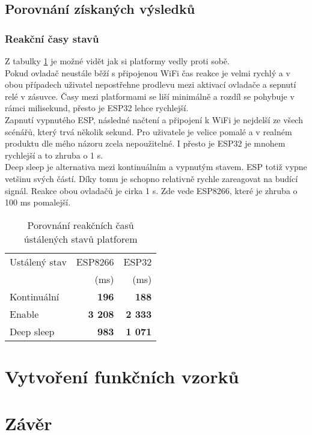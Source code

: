\documentclass[a4paper, 12pt]{report}
\begin{document}
		\section{Porovnání získaných výsledků}
			\subsection{Reakční časy stavů}
			Z tabulky \ref{Porovnání klidové režimy čas} je možné vidět jak si platformy vedly proti sobě. \\
			Pokud ovladač neustále běží s připojenou WiFi čas reakce je velmi rychlý a v obou případech uživatel nepostřehne prodlevu mezi aktivací ovladače a sepnutí relé v zásuvce. Časy mezi platformami se liší minimálně a rozdíl se pohybuje v rámci milisekund, přesto je ESP32 lehce rychlejší. \\
			Zapnutí vypnutého ESP, následné načtení a připojení k WiFi je nejdelší ze všech scénářů, který trvá několik sekund. Pro uživatele je velice pomalé a v realném produktu dle mého názoru zcela nepoužitelné. I přesto je ESP32 je mnohem rychlejší a to zhruba o 1 \si{s}. \\
			Deep sleep je alternativa mezi kontinuálním a vypnutým stavem. ESP totiž vypne vetšinu svých částí. Díky tomu je schopno relativně rychle zareagovat na budící signál. Reakce obou ovladačů je cirka 1 \si{s}. Zde vede ESP8266, které je zhruba o 100 \si{ms} pomalejší.

			\begin{table}[h]
				\centering
				\caption{Porovnání reakčních časů ústálených stavů platforem}
				\begin{tabular}{||l|r r||}
					\hline
					Ustálený stav & ESP8266 & ESP32 \\
					& (ms) & (ms) \\
					\hline
					Kontinuální & {\bf 196} & {\bf 188}\\
					Enable & {\bf 3 208} & {\bf 2 333}\\
					Deep sleep & {\bf 983} & {\bf 1 071}\\
					\hline
				\end{tabular}
				\label{Porovnání klidové režimy čas}
			\end{table}





	\chapter{Vytvoření funkčních vzorků}
	\chapter{Závěr}

	\listoftables

	\listoffigures

\end{document}
